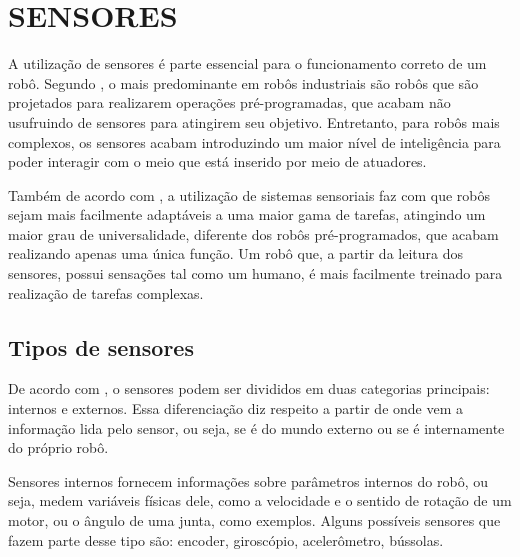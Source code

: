 \documentclass[acronym, symbols, table]{fei}
\begin{document}
		
	\section{SENSORES} \label{sec:sensores}
	
		A utilização de sensores é parte essencial para o funcionamento correto de um robô. Segundo \textcite{de2017tipos}, o mais predominante em robôs industriais são robôs que são projetados para realizarem operações pré-programadas, que acabam não usufruindo de sensores para atingirem seu objetivo. Entretanto, para robôs mais complexos, os sensores acabam introduzindo um maior nível de inteligência para poder interagir com o meio que está inserido por meio de atuadores.
		
		Também de acordo com \textcite{de2017tipos}, a utilização de sistemas sensoriais faz com que robôs sejam mais facilmente adaptáveis a uma maior gama de tarefas, atingindo um maior grau de universalidade, diferente dos robôs pré-programados, que acabam realizando apenas uma única função. Um robô que, a partir da leitura dos sensores, possui sensações tal como um humano, é mais facilmente treinado para realização de tarefas complexas.
		
		\subsection{Tipos de sensores}		
		
			De acordo com \textcite{sensorFusionKalmanFilter}, o sensores podem ser divididos em duas categorias principais: internos e externos. Essa diferenciação diz respeito a partir de onde vem a informação lida pelo sensor, ou seja, se é do mundo externo ou se é internamente do próprio robô.
			
			Sensores internos fornecem informações sobre parâmetros internos do robô, ou seja, medem variáveis físicas dele, como a velocidade e o sentido de rotação de um motor, ou o ângulo de uma junta, como exemplos. Alguns possíveis sensores que fazem parte desse tipo são: encoder, giroscópio, acelerômetro, bússolas.
			
\end{document}
